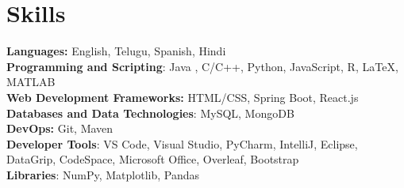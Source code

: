 \documentclass[letterpaper,11pt]{article}
\begin{document}
%
\section{Skills}
 \begin{itemize}[leftmargin=0.15in, label={}]
    \small{\item{
{\textbf{Languages:} }English, Telugu, Spanish, Hindi \\
     \textbf{Programming and Scripting}{: Java , C/C++, Python, JavaScript, R, LaTeX, MATLAB} \\
\textbf{Web Development Frameworks: } {HTML/CSS, Spring Boot, React.js}\\
     \textbf{Databases and Data Technologies}{: MySQL, MongoDB} \\
\textbf{DevOps:} {Git, Maven }\\
     \textbf{Developer Tools}{: VS Code, Visual Studio, PyCharm, IntelliJ, Eclipse, DataGrip, CodeSpace, Microsoft Office, Overleaf, Bootstrap} \\
     \textbf{Libraries}{: NumPy, Matplotlib, Pandas}\\
    }}
 \end{itemize}


\end{document}

